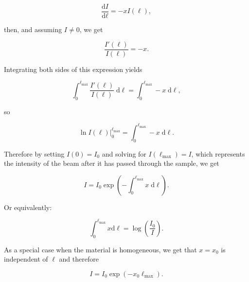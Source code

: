 \documentclass{article}
\newcommand{\diff}[2]{\frac{\text{d} #1}{\text{d} #2}}
\begin{document}
\begin{equation}\label{eq:lamberts-beer}
    \diff{I}{\ell} = -x I(\ell),
\end{equation}

\noindent then, and assuming $I \neq 0$, we get

\begin{equation}
    \frac{I'(\ell)}{I(\ell)} = -x.
\end{equation}

\noindent Integrating both sides of this expression yields

\begin{equation}
    \int_{0}^{\ell_{\max}} \frac{I'(\ell)}{I(\ell)} \; \mathrm{d}\ell = \int_{0}^{\ell_{\max}} -x \; \mathrm{d}\ell,
\end{equation}

\noindent so

\begin{equation}
    \ln{I(\ell)} \big|_{0}^{\ell_{\max}} = \int_{0}^{\ell_{\max}} -x \; \mathrm{d}\ell.
\end{equation}

\noindent Therefore by setting $I(0) = I_0$ and solving for $I(\ell_{\max}) = I$, which represents the intensity of the beam after it has passed through the sample, we get

\begin{equation}
    I = I_0 \exp{\left(-\int_{0}^{\ell_{\max}} x \; \mathrm{d}\ell \right)}.
\end{equation}

\noindent Or equivalently:

\begin{equation}
    \int_{0}^{\ell_{\max}}x \text{d} \ell = \log\left(\frac{I_0}{I}\right).
\end{equation}

\noindent As a special case when the material is homogeneous, we get that $x = x_0$ is independent of $\ell$ and therefore

\begin{equation}
    I = I_0 \exp{(-x_0 \ell_{\max})}.
\end{equation}
\end{document}
